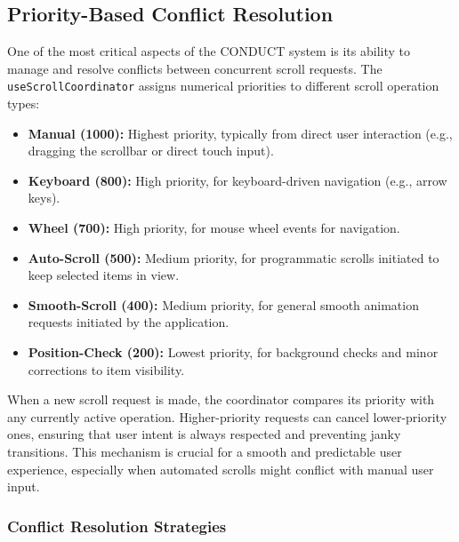 \documentclass[10pt]{article}
\begin{document}
\subsection{Priority-Based Conflict Resolution}

One of the most critical aspects of the CONDUCT system is its ability to manage and resolve conflicts between concurrent scroll requests. The \texttt{useScrollCoordinator} assigns numerical priorities to different scroll operation types:
\begin{itemize}
    \item \textbf{Manual (1000):} Highest priority, typically from direct user interaction (e.g., dragging the scrollbar or direct touch input).
    \item \textbf{Keyboard (800):} High priority, for keyboard-driven navigation (e.g., arrow keys).
    \item \textbf{Wheel (700):} High priority, for mouse wheel events for navigation.
    \item \textbf{Auto-Scroll (500):} Medium priority, for programmatic scrolls initiated to keep selected items in view.
    \item \textbf{Smooth-Scroll (400):} Medium priority, for general smooth animation requests initiated by the application.
    \item \textbf{Position-Check (200):} Lowest priority, for background checks and minor corrections to item visibility.
\end{itemize}
When a new scroll request is made, the coordinator compares its priority with any currently active operation. Higher-priority requests can cancel lower-priority ones, ensuring that user intent is always respected and preventing janky transitions. This mechanism is crucial for a smooth and predictable user experience, especially when automated scrolls might conflict with manual user input.

\subsubsection{Conflict Resolution Strategies}
\end{document}
